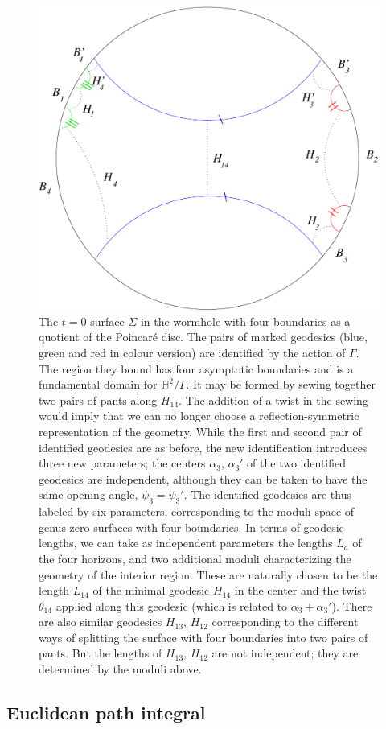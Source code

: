 \documentclass[12pt]{article}
\newcommand{\HH}{\mathbb{H}}
\numberwithin{equation}{section}
\begin{document}
\begin{figure}
\centering
\includegraphics[keepaspectratio,width=0.5\linewidth]{four.pdf}
\caption{The $t=0$ surface $\Sigma$ in the wormhole with four boundaries as a quotient of the Poincar\'e disc. The pairs of marked geodesics (blue, green and red in colour version) are identified by the action of $\Gamma$. The region they bound has four asymptotic boundaries and is a fundamental domain for $\HH^2/\Gamma$. It may be formed by sewing together two pairs of pants along $H_{14}$. The addition of a twist in the sewing would imply that we can no longer choose a reflection-symmetric representation of the geometry. While the first and second pair of identified geodesics are as before, the new identification introduces three new parameters; the centers $\alpha_3$, $\alpha_3'$ of the two identified geodesics are independent, although they can be taken to have the same opening angle, $\psi_3 = \psi_3'$. The identified geodesics are thus labeled by six parameters, corresponding to the moduli space of genus zero surfaces with four boundaries. In terms of geodesic lengths, we can take as independent parameters the lengths $L_a$ of the four horizons, and two additional moduli characterizing the geometry of the interior region.  These are naturally chosen to be the length $L_{14}$ of the minimal geodesic $H_{14}$ in the center and the twist $\theta_{14}$ applied along this geodesic (which is related to $\alpha_3 + \alpha_3'$). There are also similar geodesics $H_{13}$, $H_{12}$ corresponding to the different ways of splitting the surface with four boundaries into two pairs of pants.  But the lengths of $H_{13}$, $H_{12}$ are not independent; they are determined by the moduli above.}
\label{four}
\end{figure}

%
\subsection{Euclidean path integral}
%
\label{EPI}
\end{document}
